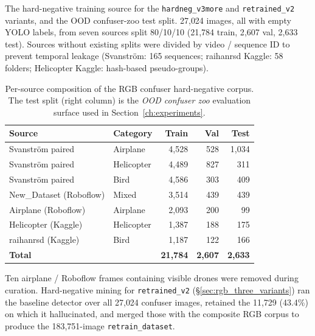 The hard-negative training source for the \texttt{hardneg\_v3more} and \texttt{retrained\_v2} variants, and the OOD confuser-zoo test split. 27{,}024 images, all with empty YOLO labels, from seven sources split 80/10/10 (21{,}784 train, 2{,}607 val, 2{,}633 test). Sources without existing splits were divided by video / sequence ID to prevent temporal leakage (Svanstr\"om: 165 sequences; raihanrsd Kaggle: 58 folders; Helicopter Kaggle: hash-based pseudo-groups).

\begin{table}[htbp]
    \centering
    \caption{Per-source composition of the RGB confuser hard-negative corpus. The test split (right column) is the \emph{OOD confuser zoo} evaluation surface used in Section~\ref{ch:experiments}.}
    \label{tab:ds_confusers}
    \begin{tabular}{llrrr}
        \toprule
        Source & Category & Train & Val & Test \\
        \midrule
        Svanstr\"om paired & Airplane    & 4{,}528 &   528 & 1{,}034 \\
        Svanstr\"om paired & Helicopter  & 4{,}489 &   827 &    311 \\
        Svanstr\"om paired & Bird        & 4{,}586 &   303 &    409 \\
        New\_Dataset (Roboflow) & Mixed  & 3{,}514 &   439 &    439 \\
        Airplane (Roboflow) & Airplane   & 2{,}093 &   200 &     99 \\
        Helicopter (Kaggle) & Helicopter & 1{,}387 &   188 &    175 \\
        raihanrsd (Kaggle) & Bird        & 1{,}187 &   122 &    166 \\
        \midrule
        \textbf{Total}     &             & \textbf{21{,}784} & \textbf{2{,}607} & \textbf{2{,}633} \\
        \bottomrule
    \end{tabular}
\end{table}

Ten airplane / Roboflow frames containing visible drones were removed during curation. Hard-negative mining for \texttt{retrained\_v2} (\S\ref{sec:rgb_three_variants}) ran the baseline detector over all 27{,}024 confuser images, retained the 11{,}729 (43.4\%) on which it hallucinated, and merged those with the composite RGB corpus to produce the 183{,}751-image \texttt{retrain\_dataset}.

